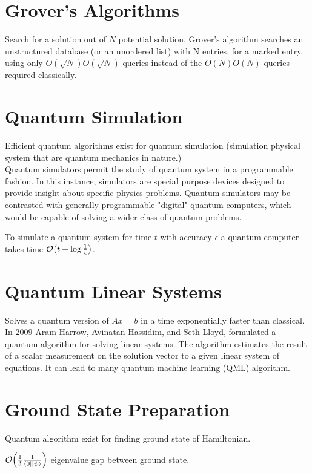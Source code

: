 \documentclass[11.5pt, paper=a4]{article}
\theoremstyle{definition}
\numberwithin{theorem}{section}
\begin{document}
\section{Grover's Algorithms}
Search for a solution out of $N$ potential solution. \citet{grover1996fast}
Grover's algorithm searches an unstructured database (or an unordered list) with N entries, for a marked entry, using only ${\displaystyle O({\sqrt {N}})}O({\sqrt  {N}})$ queries instead of the ${\displaystyle O({N})}{\displaystyle O({N})}$ queries required classically.

\section{Quantum Simulation}
Efficient quantum algorithms exist for quantum simulation (simulation physical system that are quantum mechanics in nature.)\citet{lloyd1996universal}\\
Quantum simulators permit the study of quantum system in a programmable fashion. In this instance, simulators are special purpose devices designed to provide insight about specific physics problems. Quantum simulators may be contrasted with generally programmable "digital" quantum computers, which would be capable of solving a wider class of quantum problems.

To simulate a quantum system for time $t$ with accuracy $\epsilon$ a quantum computer takes time $\order{ t + \log\frac{1}{\epsilon} }$. \citet{low2019hamiltonian}

\section{Quantum Linear Systems}
Solves a quantum version of $Ax = b$ in a time exponentially faster than classical. \citet{harrow2009quantum}
In 2009 Aram Harrow, Avinatan Hassidim, and Seth Lloyd, formulated a quantum algorithm for solving linear systems. The algorithm estimates the result of a scalar measurement on the solution vector to a given linear system of equations.
It can lead to many quantum machine learning (QML) algorithm. \citet{bhaumik2019vague}

\section{Ground State Preparation}
Quantum algorithm exist for finding ground state of Hamiltonian.\citet{abrams1999quantum}

$\order{ \frac{1}{\delta} \frac{1}{\bra{0}\ket{\psi}} }$ eigenvalue gap between ground state.\\
\end{document}
